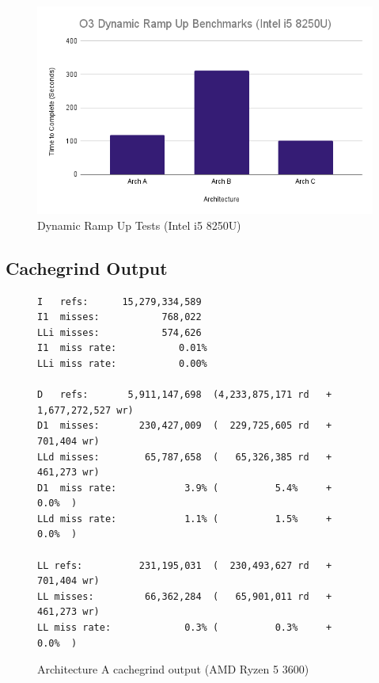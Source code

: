 \documentclass{article}
\begin{document}
\begin{figure}[!h]
\centering
\includegraphics[scale=0.5]{O3 Dynamic Ramp Up Benchmarks (Intel i5 8250U).png}
\caption{Dynamic Ramp Up Tests (Intel i5 8250U)}
\label{laptop_dynamic_ramp_up_tests}
\end{figure}

\clearpage

\subsection{Cachegrind Output}
\begin{figure}[!h]
\centering
\begin{BVerbatim}
I   refs:      15,279,334,589
I1  misses:           768,022
LLi misses:           574,626
I1  miss rate:           0.01%
LLi miss rate:           0.00%

D   refs:       5,911,147,698  (4,233,875,171 rd   + 1,677,272,527 wr)
D1  misses:       230,427,009  (  229,725,605 rd   +       701,404 wr)
LLd misses:        65,787,658  (   65,326,385 rd   +       461,273 wr)
D1  miss rate:            3.9% (          5.4%     +           0.0%  )
LLd miss rate:            1.1% (          1.5%     +           0.0%  )

LL refs:          231,195,031  (  230,493,627 rd   +       701,404 wr)
LL misses:         66,362,284  (   65,901,011 rd   +       461,273 wr)
LL miss rate:             0.3% (          0.3%     +           0.0%  )
\end{BVerbatim}
\caption{Architecture A cachegrind output (AMD Ryzen 5 3600)}
\label{arch_a_cachegrind_pc}
\end{figure}
\end{document}

